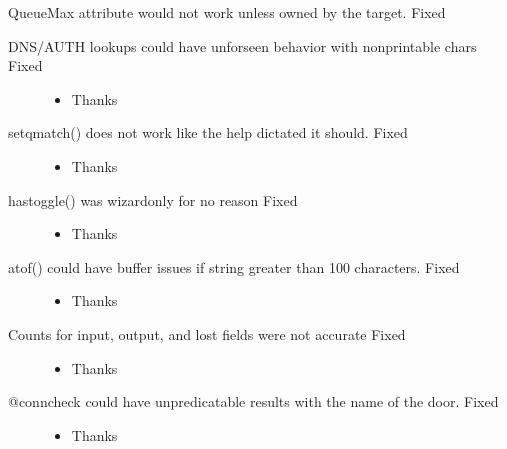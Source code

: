 \documentclass[letterpaper,10pt,english]{sphinxmanual}
\begin{document}
\sphinxAtStartPar
QueueMax attribute would not work unless owned by the target. \sphinxhyphen{} Fixed
\begin{description}
\item[{DNS/AUTH lookups could have unforseen behavior with non\sphinxhyphen{}printable chars \sphinxhyphen{} Fixed}] \leavevmode\begin{itemize}
\item {} 
\sphinxAtStartPar
Thanks 

\end{itemize}

\item[{setqmatch() does not work like the help dictated it should. \sphinxhyphen{} Fixed}] \leavevmode\begin{itemize}
\item {} 
\sphinxAtStartPar
Thanks 

\end{itemize}

\item[{hastoggle() was wizard\sphinxhyphen{}only for no reason \sphinxhyphen{} Fixed}] \leavevmode\begin{itemize}
\item {} 
\sphinxAtStartPar
Thanks 

\end{itemize}

\item[{atof() could have buffer issues if string greater than 100 characters. \sphinxhyphen{} Fixed}] \leavevmode\begin{itemize}
\item {} 
\sphinxAtStartPar
Thanks 

\end{itemize}

\item[{Counts for input, output, and lost fields were not accurate \sphinxhyphen{} Fixed}] \leavevmode\begin{itemize}
\item {} 
\sphinxAtStartPar
Thanks 

\end{itemize}

\item[{@conncheck could have unpredicatable results with the name of the door. \sphinxhyphen{} Fixed}] \leavevmode\begin{itemize}
\item {} 
\sphinxAtStartPar
Thanks 


\end{itemize}
\end{description}
\end{document}
